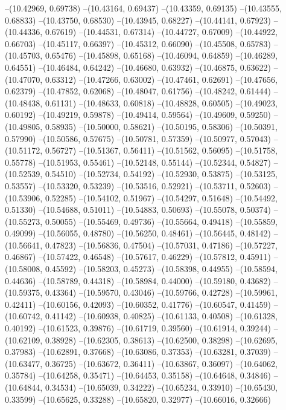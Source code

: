 --(10.42969, 0.69738)
--(10.43164, 0.69437)
--(10.43359, 0.69135)
--(10.43555, 0.68833)
--(10.43750, 0.68530)
--(10.43945, 0.68227)
--(10.44141, 0.67923)
--(10.44336, 0.67619)
--(10.44531, 0.67314)
--(10.44727, 0.67009)
--(10.44922, 0.66703)
--(10.45117, 0.66397)
--(10.45312, 0.66090)
--(10.45508, 0.65783)
--(10.45703, 0.65476)
--(10.45898, 0.65168)
--(10.46094, 0.64859)
--(10.46289, 0.64551)
--(10.46484, 0.64242)
--(10.46680, 0.63932)
--(10.46875, 0.63622)
--(10.47070, 0.63312)
--(10.47266, 0.63002)
--(10.47461, 0.62691)
--(10.47656, 0.62379)
--(10.47852, 0.62068)
--(10.48047, 0.61756)
--(10.48242, 0.61444)
--(10.48438, 0.61131)
--(10.48633, 0.60818)
--(10.48828, 0.60505)
--(10.49023, 0.60192)
--(10.49219, 0.59878)
--(10.49414, 0.59564)
--(10.49609, 0.59250)
--(10.49805, 0.58935)
--(10.50000, 0.58621)
--(10.50195, 0.58306)
--(10.50391, 0.57990)
--(10.50586, 0.57675)
--(10.50781, 0.57359)
--(10.50977, 0.57043)
--(10.51172, 0.56727)
--(10.51367, 0.56411)
--(10.51562, 0.56095)
--(10.51758, 0.55778)
--(10.51953, 0.55461)
--(10.52148, 0.55144)
--(10.52344, 0.54827)
--(10.52539, 0.54510)
--(10.52734, 0.54192)
--(10.52930, 0.53875)
--(10.53125, 0.53557)
--(10.53320, 0.53239)
--(10.53516, 0.52921)
--(10.53711, 0.52603)
--(10.53906, 0.52285)
--(10.54102, 0.51967)
--(10.54297, 0.51648)
--(10.54492, 0.51330)
--(10.54688, 0.51011)
--(10.54883, 0.50693)
--(10.55078, 0.50374)
--(10.55273, 0.50055)
--(10.55469, 0.49736)
--(10.55664, 0.49418)
--(10.55859, 0.49099)
--(10.56055, 0.48780)
--(10.56250, 0.48461)
--(10.56445, 0.48142)
--(10.56641, 0.47823)
--(10.56836, 0.47504)
--(10.57031, 0.47186)
--(10.57227, 0.46867)
--(10.57422, 0.46548)
--(10.57617, 0.46229)
--(10.57812, 0.45911)
--(10.58008, 0.45592)
--(10.58203, 0.45273)
--(10.58398, 0.44955)
--(10.58594, 0.44636)
--(10.58789, 0.44318)
--(10.58984, 0.44000)
--(10.59180, 0.43682)
--(10.59375, 0.43364)
--(10.59570, 0.43046)
--(10.59766, 0.42728)
--(10.59961, 0.42411)
--(10.60156, 0.42093)
--(10.60352, 0.41776)
--(10.60547, 0.41459)
--(10.60742, 0.41142)
--(10.60938, 0.40825)
--(10.61133, 0.40508)
--(10.61328, 0.40192)
--(10.61523, 0.39876)
--(10.61719, 0.39560)
--(10.61914, 0.39244)
--(10.62109, 0.38928)
--(10.62305, 0.38613)
--(10.62500, 0.38298)
--(10.62695, 0.37983)
--(10.62891, 0.37668)
--(10.63086, 0.37353)
--(10.63281, 0.37039)
--(10.63477, 0.36725)
--(10.63672, 0.36411)
--(10.63867, 0.36097)
--(10.64062, 0.35784)
--(10.64258, 0.35471)
--(10.64453, 0.35158)
--(10.64648, 0.34846)
--(10.64844, 0.34534)
--(10.65039, 0.34222)
--(10.65234, 0.33910)
--(10.65430, 0.33599)
--(10.65625, 0.33288)
--(10.65820, 0.32977)
--(10.66016, 0.32666)
